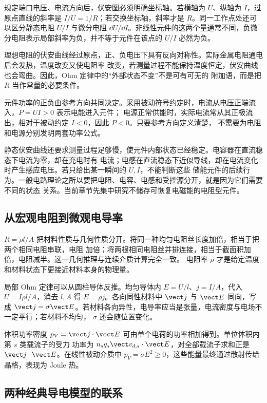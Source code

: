 规定端口电压、电流方向后，伏安图必须明确坐标轴。若横轴为 $U$、纵轴为 $I$，过原点直线的斜率是
$I/U=1/R$；若交换坐标轴，斜率才是 $R$。同一工作点处还可以区分静态电阻 $U/I$ 与微分电阻
$\dd U/\dd I$。非线性元件的这两个量通常不同，负微分电阻表示局部斜率为负，并不等于元件在该点的
$U/I$ 必然为负。

理想电阻的伏安曲线经过原点，正、负电压下具有反向对称性。实际金属电阻通电后会发热，温度改变又使电阻率
改变，若测量过程不能保持温度恒定，伏安曲线也会弯曲。因此，Ohm 定律中的“外部状态不变”不是可有可无的
附加语，而是把 $R$ 当作常量的必要条件。

元件功率的正负由参考方向共同决定。采用被动符号约定时，电流从电压正端流入，$P=UI>0$ 表示电能进入元件；
电源正常供能时，实际电流常从其正极流出，相对于被动约定 $I<0$，因此 $P<0$。只要参考方向定义清楚，
不需要为电阻和电源分别发明两套功率公式。

静态伏安曲线还要求测量过程足够慢，使元件内部状态已经稳定。电容器在直流稳态下电流为零，却在充电时有
电流；电感在直流稳态下近似导线，却在电流变化时产生感应电压。若只给出某一瞬间的 $U,I$，不能判断这些
储能元件的后续行为。一般电路理论之所以要把电阻、电容、电感和受控源分开，就是因为它们需要不同的状态
关系。当前章节先集中研究不储存可恢复电磁能的电阻型元件。

\subsection*{从宏观电阻到微观电导率}

$R=\rho l/A$ 把材料性质与几何性质分开。将同一种均匀电阻丝长度加倍，相当于把两个相同电阻串联，电阻
加倍；将两根相同电阻丝并排连接，相当于截面积加倍，电阻减半。这一几何推理与连续介质计算完全一致。
电阻率 $\rho$ 才是给定温度和材料状态下更接近材料本身的物理量。

局部 Ohm 定律可以从圆柱导体反推。均匀导体内 $E=U/l$、$j=I/A$，代入
$U=I\rho l/A$，消去 $l,A$ 得 $E=\rho j$。各向同性材料中 $\vect j$ 与 $\vect E$ 同向，写成
$\vect j=\sigma\vect E$。若材料各向异性，电导率应当是张量，电流密度与电场不一定平行；若材料不均匀，
$\sigma$ 还会随位置变化。

体积功率密度 $p_V=\vect j\cdot\vect E$ 可由单个电荷的功率相加得到。单位体积内第 $s$ 类载流子的受力
功率为 $n_sq_s\vect v_{d,s}\cdot\vect E$，对全部载流子求和正是 $\vect j\cdot\vect E$。在线性被动介质中
$p_V=\sigma E^2\geq0$，这些能量最终通过散射传给晶格，表现为 Joule 热。

\subsection*{两种经典导电模型的联系}

